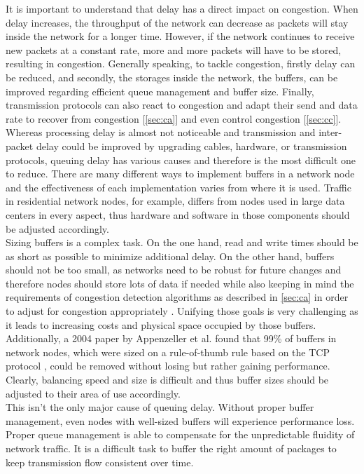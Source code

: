 \documentclass[a4paper,conference]{IEEEtran}
\begin{document}
It is important to understand that delay has a direct impact on congestion. When delay increases, the throughput of the network can decrease as packets will stay inside the network for a longer time. However, if the network continues to receive new packets at a constant rate, more and more packets will have to be stored, resulting in congestion. Generally speaking, to tackle congestion, firstly delay can be reduced, and secondly, the storages inside the network, the buffers, can be improved regarding efficient queue management and buffer size. Finally, transmission protocols can also react to congestion and adapt their send and data rate to recover from congestion [\autoref{sec:ca}] and even control congestion [\autoref{sec:cc}].
\\Whereas processing delay is almost not noticeable and transmission and inter-packet delay could be improved by upgrading cables, hardware, or transmission protocols, queuing delay has various causes and therefore is the  most difficult one to reduce. There are many different ways to implement buffers in a network node and the effectiveness of each implementation varies from where it is used. Traffic in residential network nodes, for example, differs from nodes used in large data centers in every aspect, thus hardware and software in those components should be adjusted accordingly.
\\Sizing buffers is a complex task. On the one hand, read and write times should be as short as possible to minimize additional delay. On the other hand, buffers should not be too small, as networks need to be robust for future changes and therefore nodes should store lots of data if needed while also keeping in mind the requirements of congestion detection algorithms as described in \autoref{sec:ca} in order to adjust for congestion appropriately \cite{staff2012bufferbloat}. Unifying those goals is very challenging as it leads to increasing costs and physical space occupied by those buffers. Additionally, a 2004 paper by Appenzeller et al. \cite{appenzeller2004sizing} found that 99\% of buffers in network nodes, which were sized on a rule-of-thumb rule based on the TCP protocol \cite{villamizar1994high}, could be removed without losing but rather gaining performance. Clearly, balancing speed and size is difficult and thus buffer sizes should be adjusted to their area of use accordingly.
\\This isn't the only major cause of queuing delay. Without proper buffer management, even nodes with well-sized buffers will experience performance loss. Proper queue management is able to compensate for the unpredictable fluidity of network traffic. It is a difficult task to buffer the right amount of packages to keep transmission flow consistent over time.
\end{document}
